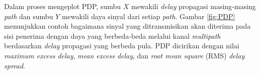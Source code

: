 Dalam proses mengeplot PDP, sumbu $X$ mewakili \textit{delay} propagasi masing-masing \textit{path} dan sumbu $Y$ mewakili daya sinyal dari setiap \textit{path}. Gambar \ref{fig:PDP} menunjukkan contoh bagaimana sinyal yang ditransmisikan akan diterima pada sisi penerima dengan daya yang berbeda-beda melalui kanal \textit{multipath} berdasarkan \textit{delay} propagasi yang berbeda pula. PDP dicirikan dengan nilai \textit{maximum excess delay}, \textit{mean excess delay}, dan \textit{root mean square} (RMS) \textit{delay spread}.
%
 	



